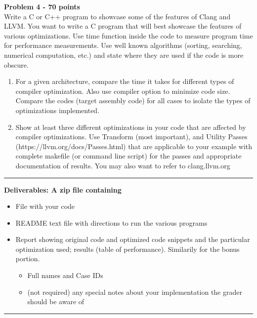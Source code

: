 \documentclass[a4paper, 11pt]{article}
\newenvironment{problem}[2][Problem]
    { \begin{mdframed}[backgroundcolor=gray!20] \textbf{#1 #2} \\}
    {  \end{mdframed}}
\begin{document}
\begin{problem}{4 - 70 points}
Write a C or C++ program to showcase some of the features of Clang and LLVM. You want to write a C program that will best showcase the features of various optimizations. Use time function inside the code to measure program time for performance measurements. Use well known algorithms (sorting, searching, numerical computation, etc.) and state where they are used if the code is more obscure.

\begin{enumerate}
    \item For a given architecture, compare the time it takes for different types of compiler optimization. Also use compiler option to minimize code size. Compare the codes (target assembly code) for all cases to isolate the types of optimizations implemented. 
    \item Show at least three different optimizations in your code that are affected by compiler optimizations. Use Transform (most important), and Utility Passes  (https://llvm.org/docs/Passes.html) that are applicable to your example with complete makefile (or command line script) for the passes and appropriate documentation of results. You may also want to refer to clang.llvm.org
    
\end{enumerate}

\end{problem}
\noindent\rule{7in}{2.8pt}



\bf{Deliverables:} A zip file containing
\begin{itemize}
    \item File with your code
    \item README text file with directions to run the various programs
    \item Report showing original code and optimized code snippets and the particular optimization used; results (table of performance). Similarily for the bonus portion.
    \begin{itemize}
        \item Full names and Case IDs
        \item (not required) any special notes about your implementation the grader should be aware of
    \end{itemize}
    
\end{itemize}
\noindent\rule{7in}{2.8pt}
\end{document}
